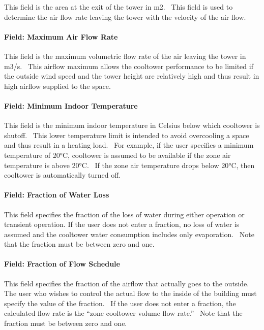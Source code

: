 This field is the area at the exit of the tower in m2. ~This field is used to determine the air flow rate leaving the tower with the velocity of the air flow.

\paragraph{Field: Maximum Air Flow Rate}\label{field-maximum-air-flow-rate-000}

This field is the maximum volumetric flow rate of the air leaving the tower in m3/s. ~This airflow maximum allows the cooltower performance to be limited if the outside wind speed and the tower height are relatively high and thus result in high airflow supplied to the space.

\paragraph{Field: Minimum Indoor Temperature}\label{field-minimum-indoor-temperature-2}

This field is the minimum indoor temperature in Celsius below which cooltower is shutoff. ~This lower temperature limit is intended to avoid overcooling a space and thus result in a heating load. ~For example, if the user specifies a minimum temperature of 20°C, cooltower is assumed to be available if the zone air temperature is above 20°C. ~If the zone air temperature drops below 20°C, then cooltower is automatically turned off.

\paragraph{Field: Fraction of Water Loss}\label{field-fraction-of-water-loss}

This field specifies the fraction of the loss of water during either operation or transient operation. If the user does not enter a fraction, no loss of water is assumed and the cooltower water consumption includes only evaporation.~ Note that the fraction must be between zero and one.

\paragraph{Field: Fraction of Flow Schedule}\label{field-fraction-of-flow-schedule}

This field specifies the fraction of the airflow that actually goes to the outside.~ The user who wishes to control the actual flow to the inside of the building must specify the value of the fraction.~ If the user does not enter a fraction, the calculated flow rate is the ``zone cooltower volume flow rate.''~ Note that the fraction must be between zero and one.

